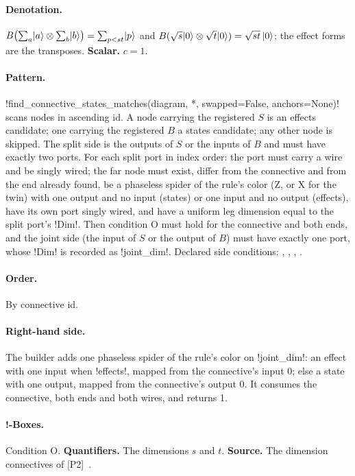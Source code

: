 \paragraph{Denotation.} $B\bigl(\sum_a\lvert a \rangle\otimes\sum_b\lvert b \rangle\bigr)=\sum_{p<st}\lvert p \rangle$ and $B(\sqrt s\lvert 0 \rangle\otimes\sqrt t\lvert 0 \rangle)=\sqrt{st}\,\lvert 0 \rangle$; the effect forms are the transposes. \textbf{Scalar.} $c=1$.

\paragraph{Pattern.} \py!find_connective_states_matches(diagram, *, swapped=False, anchors=None)! scans nodes in ascending id. A node carrying the registered $S$ is an effects candidate; one carrying the registered $B$ a states candidate; any other node is skipped. The split side is the outputs of $S$ or the inputs of $B$ and must have exactly two ports. For each split port in index order: the port must carry a wire and be singly wired; the far node must exist, differ from the connective and from the end already found, be a phaseless spider of the rule's color (Z, or X for the twin) with one output and no input (states) or one input and no output (effects), have its own port singly wired, and have a uniform leg dimension equal to the split port's \py!Dim!. Then condition O must hold for the connective and both ends, and the joint side (the input of $S$ or the output of $B$) must have exactly one port, whose \py!Dim! is recorded as \py!joint_dim!. Declared side conditions: , , , .

\paragraph{Order.} By connective id.

\paragraph{Right-hand side.} The builder adds one phaseless spider of the rule's color on \py!joint_dim!: an effect with one input when \py!effects!, mapped from the connective's input 0; else a state with one output, mapped from the connective's output 0. It consumes the connective, both ends and both wires, and returns 1.

\paragraph{!-Boxes.} Condition O. \textbf{Quantifiers.} The dimensions $s$ and $t$. \textbf{Source.} The dimension connectives of [P2]~\cite{wang2023qufinitezxw}.

